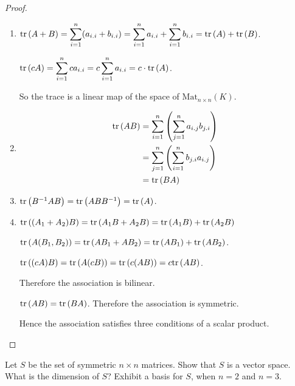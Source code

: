 \begin{proof}
    \begin{enumerate}[label={(\alph*)}]
        \item $\text{tr}\left({A + B}\right) = \displaystyle\sum^{n}_{i=1}(a_{i.i} + b_{i.i}) = \displaystyle\sum^{n}_{i=1} a_{i.i} + \displaystyle\sum^{n}_{i=1} b_{i.i} = \text{tr}\left({A}\right) + \text{tr}\left({B}\right)$.

              $\text{tr}\left({cA}\right) = \displaystyle\sum^{n}_{i=1}ca_{i.i} = c\displaystyle\sum^{n}_{i=1} a_{i.i} = c\cdot\text{tr}\left({A}\right)$.

              So the trace is a linear map of the space of $\text{Mat}_{n\times n}(K)$.
        \item \begin{align*}
                  \text{tr}\left({AB}\right) & = \sum^{n}_{i=1}\left(\sum^{n}_{j=1}a_{i.j}b_{j.i}\right) \\
                          & = \sum^{n}_{j=1}\left(\sum^{n}_{i=1}b_{j.i}a_{i.j}\right) \\
                          & = \text{tr}\left({BA}\right)
              \end{align*}
        \item $\text{tr}\left({B^{-1}AB}\right) = \text{tr}\left({ABB^{-1}}\right) = \text{tr}\left({A}\right)$.
        \item $\text{tr}\left({(A_{1} + A_{2})B}\right) = \text{tr}\left({A_{1}B + A_{2}B}\right) = \text{tr}\left({A_{1}B}\right) + \text{tr}\left({A_{2}B}\right)$

              $\text{tr}\left({A(B_{1}, B_{2})}\right) = \text{tr}\left({AB_{1} + AB_{2}}\right) = \text{tr}\left({AB_{1}}\right) + \text{tr}\left({AB_{2}}\right)$.

              $\text{tr}\left({(cA)B}\right) = \text{tr}\left({A(cB)}\right) = \text{tr}\left({c(AB)}\right) = c\text{tr}\left({AB}\right)$.

              Therefore the association is bilinear.

              $\text{tr}\left({AB}\right) = \text{tr}\left({BA}\right)$. Therefore the association is symmetric.

              Hence the association satisfies three conditions of a scalar product.
    \end{enumerate}
\end{proof}

\begin{exercise}
    Let $S$ be the set of symmetric $n\times n$ matrices. Show that $S$ is a vector space. What is the dimension of $S$? Exhibit a basis for $S$, when $n = 2$ and $n = 3$.
\end{exercise}

